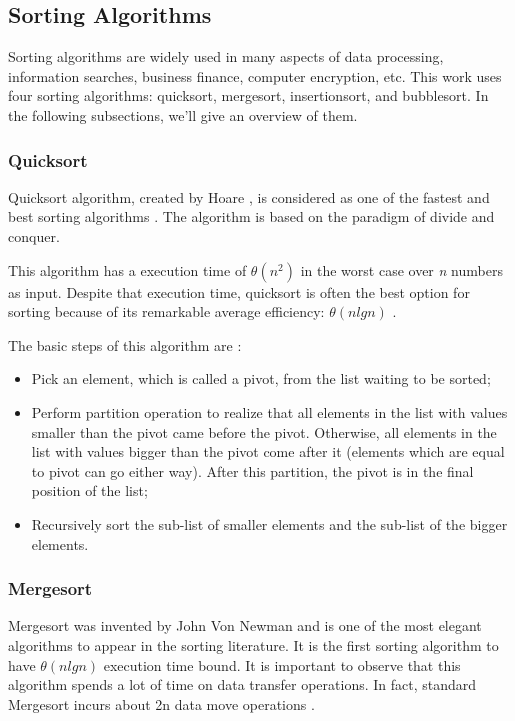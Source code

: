 \subsection{Sorting Algorithms}

Sorting algorithms are widely used in many aspects of data processing, information searches, business finance, computer encryption, etc. This work uses four sorting algorithms: quicksort, mergesort, insertionsort, and bubblesort. In the following subsections, we'll give an overview of them.

\subsubsection{Quicksort}

Quicksort algorithm, created by Hoare \cite{Hoare1962}, is considered as one of the fastest and best sorting algorithms \cite{Wang2011}. The algorithm is based on the paradigm of divide and conquer.

This algorithm has a execution time of $\theta(n^2)$ in the worst case over \textit{n} numbers as input. Despite that execution time, quicksort is often the best option for sorting because of its remarkable average efficiency: $\theta(n lg n)$ \cite{Cormen2009}.

The basic steps of this algorithm are \cite{Wang2011}:
\begin{itemize}
    \item Pick an element, which is called a pivot, from the list waiting to be sorted;
    \item Perform partition operation to realize that all elements in the list with values smaller than the pivot came before the pivot. Otherwise, all elements in the list with values bigger than the pivot come after it (elements which are equal to pivot can go either way). After this partition, the pivot is in the final position of the list;
    \item Recursively sort the sub-list of smaller elements and the sub-list of the bigger elements.
\end{itemize}

\subsubsection{Mergesort}

Mergesort was invented by John Von Newman and is one of the most elegant algorithms to appear in the sorting literature. It is the first sorting algorithm to have $\theta(n lg n)$ execution time bound. It is important to observe that this algorithm spends a lot of time on data transfer operations. In fact, standard Mergesort incurs about 2n data move operations \cite{Abhyankar2011}.

